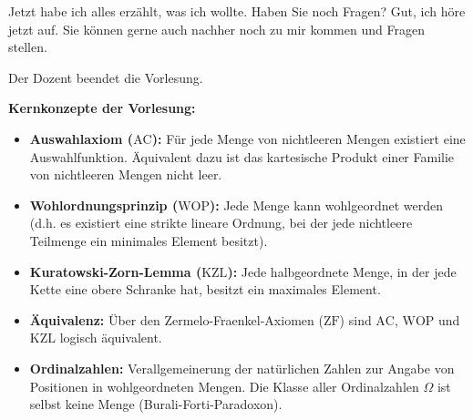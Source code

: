 \begin{spoken-clean}[01:12:40 - 01:33:02]
Jetzt habe ich alles erzählt, was ich wollte. Haben Sie noch Fragen? Gut, ich höre jetzt auf. Sie können gerne auch nachher noch zu mir kommen und Fragen stellen.
\end{spoken-clean}

\begin{meta-note}
Der Dozent beendet die Vorlesung.
\end{meta-note}

\begin{nice-box}
\textbf{Kernkonzepte der Vorlesung:}
\begin{itemize}
    \item \textbf{Auswahlaxiom ($\text{AC}$):} Für jede Menge von nichtleeren Mengen existiert eine Auswahlfunktion. Äquivalent dazu ist das kartesische Produkt einer Familie von nichtleeren Mengen nicht leer.
    \item \textbf{Wohlordnungsprinzip ($\text{WOP}$):} Jede Menge kann wohlgeordnet werden (d.h. es existiert eine strikte lineare Ordnung, bei der jede nichtleere Teilmenge ein minimales Element besitzt).
    \item \textbf{Kuratowski-Zorn-Lemma ($\text{KZL}$):} Jede halbgeordnete Menge, in der jede Kette eine obere Schranke hat, besitzt ein maximales Element.
    \item \textbf{Äquivalenz:} Über den Zermelo-Fraenkel-Axiomen ($\text{ZF}$) sind $\text{AC}$, $\text{WOP}$ und $\text{KZL}$ logisch äquivalent.
    \item \textbf{Ordinalzahlen:} Verallgemeinerung der natürlichen Zahlen zur Angabe von Positionen in wohlgeordneten Mengen. Die Klasse aller Ordinalzahlen $\Omega$ ist selbst keine Menge (Burali-Forti-Paradoxon).
\end{itemize}
\end{nice-box}